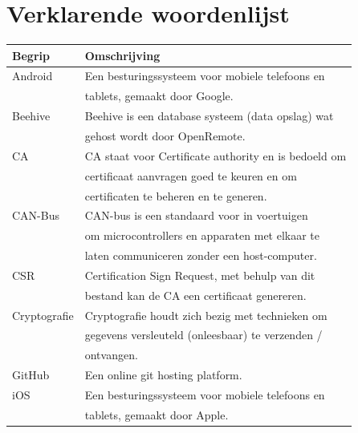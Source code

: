 \documentclass[]{article}
\begin{document}
\newpage
\section{Verklarende woordenlijst}

\begin{tabular}{|| l | l ||}\hline
    Begrip           & Omschrijving                                         \\\hline\hline
    Android          & Een besturingssysteem voor mobiele telefoons en      \\
                     & tablets, gemaakt door Google.                        \\\hline
    Beehive          & Beehive is een database systeem (data opslag) wat    \\
                     & gehost wordt door OpenRemote.                        \\\hline
    CA               & CA staat voor Certificate authority en is bedoeld om \\
                     & certificaat aanvragen goed te keuren en om           \\
                     & certificaten te beheren en te generen.               \\\hline
    CAN-Bus          & CAN-bus is een standaard voor in voertuigen          \\
                     & om microcontrollers en apparaten met elkaar te       \\
                     & laten communiceren zonder een host-computer.        \\\hline
    CSR              & Certification Sign Request, met behulp van dit       \\
                     & bestand kan de CA een certificaat genereren.         \\\hline
    Cryptografie     & Cryptografie houdt zich bezig met technieken om      \\
                     & gegevens versleuteld (onleesbaar) te verzenden /     \\
                     & ontvangen.                                           \\\hline
    GitHub           & Een online git hosting platform.                     \\\hline
    iOS              & Een besturingssysteem voor mobiele telefoons en      \\
                     & tablets, gemaakt door Apple.                         \\\hline

\end{tabular}
\end{document}
